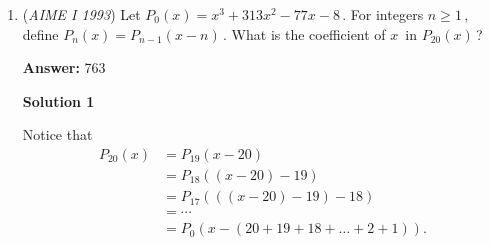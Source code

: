 \begin{enumerate}
 Since there are 405 possibilities in the first case and 465 possibilities in the second case, in total there are $405 + 465 = \boxed{870}$ four-tuples.

 



\textbf{Solution 6}

Assume $d = x+m, a = x-m, c = x+n$, and $b = x-n$. This clearly satisfies the condition that $a+d = b+c$ since ($2x = 2x$) . Now plug this into $bc-ad = 93$. You get $(x+n)(x-n) - (x+m)(x-m) = 93 \Rightarrow m^2 - n^2 = 93 \Rightarrow (m-n)(m+n) = 93$

 Since $m>n$ (as given by the condition that $a<b<c<d$), $m+n>m-n$ and $m$ and $n$ are integers, there are two cases we have to consider since $93 = 3\cdot 31$. We first have to consider $m-n = 1, m+n = 93$, and then consider $m-n=3, m+n = 31$. 

 In the first case, we get $m=47, n=46$ and in the second case we get $m=17, n=14$. Now plug these values (in separate cases) back into $a,b,c,d$. Since the only restriction is that all numbers have to be greater than $0$ or less than $500$, we can write two inequalities. Either $x+47 < 500, x-47 > 0$, or $x+17 < 500, x-17 > 0$ (using the inequalities given by $d$ and $a$, and since $b$ and $c$ are squeezed in between $d$ and $a$, we only have to consider these two inequalities).

 This gives us either $47 < x < 453$ or $17 < x < 483$, and using simple counting, there are $405$ values for $x$ in the first case and $465$ values for $x$ in the second case, and hence our answer is $405+465 = \boxed{870}$



	\item (\textit{AIME I 1993}) Let $P_0(x) = x^3 + 313x^2 - 77x - 8\,$.  For integers $n \ge 1\,$, define $P_n(x) = P_{n - 1}(x - n)\,$.  What is the coefficient of $x\,$ in $P_{20}(x)\,$?


 
 \textbf{Answer: }763



\textbf{Solution 1}

Notice that 
 \begin{align*}P_{20}(x) &= P_{19}(x - 20)\\ &= P_{18}((x - 20) - 19)\\ &= P_{17}(((x - 20) - 19) - 18)\\ &= \cdots\\ &= P_0(x - (20 + 19 + 18 + \ldots + 2 + 1)).\end{align*}



\end{enumerate}
